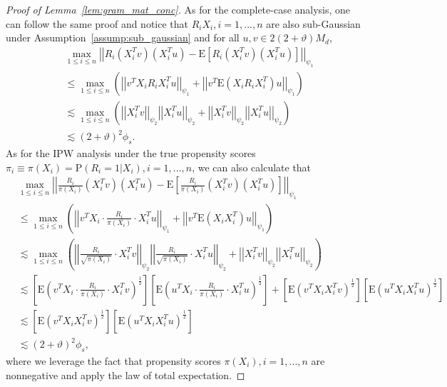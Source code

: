 \documentclass[ejsv2,noshowframe]{imsart}
\theoremstyle{plain}
\theoremstyle{definition}
\theoremstyle{remark}
\newcommand{\norm}[1]{\left|\left| #1 \right|\right|}
\begin{document}
\begin{proof}[Proof of Lemma~\ref{lem:gram_mat_conc}]
	As for the complete-case analysis, one can follow the same proof and notice that $R_iX_i, i=1,...,n$ are also sub-Gaussian under Assumption~\ref{assump:sub_gaussian} and for all $u,v \in 2(2+\vartheta)M_d$,
	\begin{align*}
		&\max_{1\leq i\leq n}\norm{R_i(X_i^T v)(X_i^T u) - \mathrm{E}\left[R_i(X_i^T v)(X_i^T u) \right]}_{\psi_1}\\
		&\leq \max_{1\leq i\leq n} \left(\norm{v^T X_iR_iX_i^T u}_{\psi_1} + \norm{v^T \mathrm{E}\left(X_iR_iX_i^T\right) u}_{\psi_1} \right)\\
		&\lesssim \max_{1\leq i\leq n} \left(\norm{X_i^T v}_{\psi_2}\norm{X_i^T u}_{\psi_2} + \norm{X_i^Tv}_{\psi_2}\norm{X_i^T u}_{\psi_2} \right)\\
		&\lesssim (2+\vartheta)^2 \phi_s.
	\end{align*}
	As for the IPW analysis under the true propensity scores $\pi_i\equiv\pi(X_i) = \mathrm{P}(R_i=1|X_i), i=1,...,n$, we can also calculate that 
	\begin{align*}
		&\max_{1\leq i\leq n}\norm{\frac{R_i}{\pi(X_i)}(X_i^T v)(X_i^T u) - \mathrm{E}\left[\frac{R_i}{\pi(X_i)}(X_i^T v)(X_i^T u) \right]}_{\psi_1}\\
		&\leq \max_{1\leq i\leq n} \left(\norm{v^T X_i\cdot \frac{R_i}{\pi(X_i)} \cdot X_i^T u}_{\psi_1} + \norm{v^T \mathrm{E}\left(X_i X_i^T\right) u}_{\psi_1} \right)\\
		&\lesssim \max_{1\leq i\leq n} \left(\norm{\frac{R_i}{\sqrt{\pi(X_i)}} \cdot X_i^T v}_{\psi_2}\norm{\frac{R_i}{\sqrt{\pi(X_i)}}\cdot X_i^T u}_{\psi_2} + \norm{X_i^Tv}_{\psi_2}\norm{X_i^T u}_{\psi_2} \right)\\
		&\lesssim \left[\mathrm{E}\left(v^T X_i \cdot \frac{R_i}{\pi(X_i)} \cdot X_i^T v\right)^{\frac{1}{2}} \right] \left[\mathrm{E}\left(u^T X_i \cdot \frac{R_i}{\pi(X_i)} \cdot X_i^T u\right)^{\frac{1}{2}} \right] + \left[\mathrm{E}\left(v^T X_i X_i^T v\right)^{\frac{1}{2}} \right] \left[\mathrm{E}\left(u^T X_i X_i^T u\right)^{\frac{1}{2}} \right]\\
		&\lesssim \left[\mathrm{E}\left(v^T X_i X_i^T v\right)^{\frac{1}{2}} \right] \left[\mathrm{E}\left(u^T X_i X_i^T u\right)^{\frac{1}{2}} \right]\\
		&\lesssim (2+\vartheta)^2 \phi_s,
	\end{align*}
	where we leverage the fact that propensity scores $\pi(X_i),i=1,...,n$ are nonnegative and apply the law of total expectation.
\end{proof}

\vspace{3mm}
\end{document}
